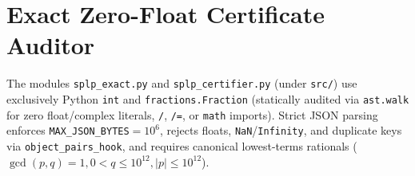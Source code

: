 \documentclass[10pt,twocolumn]{article}
\begin{document}
\section{Exact Zero-Float Certificate Auditor}\label{sec:certifier}
{\raggedright
The modules \texttt{splp\_\allowbreak exact.py} and \texttt{splp\_\allowbreak certifier.py} (under \texttt{src/}) use exclusively Python \texttt{int} and \texttt{fractions.\allowbreak Fraction} (statically audited via \texttt{ast.walk} for zero float/complex literals, \texttt{/}, \texttt{/=}, or \texttt{math} imports). Strict JSON parsing enforces \texttt{MAX\_\allowbreak JSON\_\allowbreak BYTES}$=10^6$, rejects floats, \texttt{NaN}/\texttt{Infinity}, and duplicate keys via \texttt{object\_\allowbreak pairs\_\allowbreak hook}, and requires canonical lowest-terms rationals ($\gcd(p,q)=1, 0<q\le 10^{12}, |p|\le 10^{12}$).

}
\end{document}
